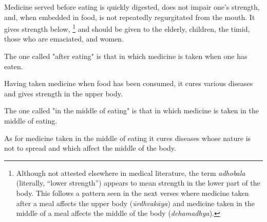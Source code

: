 \begin{translation}
	\item[89] %
	Medicine served before eating %
	is quickly digested, %
	does not impair one's strength, %
	and, when embedded in food, %
	is not repeatedly %
	regurgitated from the mouth.
	It gives strength below,%
	\footnote{Although not attested elsewhere in medical literature, the term \emph{adhobala} (literally, ``lower strength'') appears to mean strength in the lower part of the body. This follows a pattern seen in the next verses where medicine taken after a meal affects the upper body (\emph{ūrdhvakāya}) and medicine taken in the middle of a meal affects the middle of the body (\emph{dehamadhya}).}
	and should be given to the elderly, children, the timid, those who are emaciated, and women.

	\item[90]
	The one called "after eating" is that in which medicine is taken when one has eaten. %

	\item[91]
	Having taken medicine %
	when food has been consumed, %
	it %
	cures various diseases and gives strength in the upper body. %

	\item[92]
	The one called "in the middle of eating" is that in which medicine is taken in the middle of eating. %

	\item[93]
	As for medicine taken in the middle of eating %
	it cures %
	diseases %
	whose nature is not to spread %
	and which %
	affect the middle of the body. %


\end{translation}
